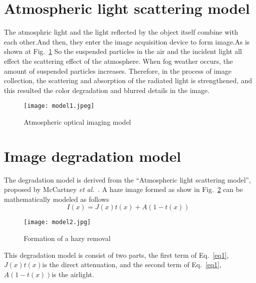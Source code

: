 \documentclass[10pt,twocolumn,letterpaper]{article}
\begin{document}
\section{Atmospheric light scattering model}
 \par The atmosphric light and the light reflected by the object itself combine with each other.And then, they enter the image acquisition device to form image.As is shown at Fig.~\ref{model1} So the suspended particles in the air and the incident light all effect the scattering effect of the atmosphere. When fog weather occurs, the amount of suspended particles increases. Therefore, in the process of image collection, the scattering and absorption of the radiated light is strengthened, and this resulted the color degradation and blurred details in the image.
\begin{figure}[htbp]
 \centering{}
\texttt{[image: model1.jpeg]}\\
 \caption{Atmospheric optical imaging model}
\label{model1}
\end{figure}
\section{Image degradation model}
 \par The degradation model is derived from the “Atmospheric light scattering model”, proposed by McCartney \emph{et al.}~\cite{Mccartney1976Optics}. A haze image formed as show in Fig.~\ref{model2} can be mathematically modeled as follows
\begin{equation}
I(x)=J(x)t(x)+A(1-t(x)) \label{eq1}
\end{equation}
\begin{figure}[htbp]
 \centering{}
\texttt{[image: model2.jpg]}\\
 \caption{Formation of a hazy removal}
\label{model2}
\end{figure}
\par This degradation model is consist of two parts, the first term of Eq.~\ref{eq1}, $J(x)t(x)$is the direct attenuation, and the second term of Eq.~\ref{eq1}, $A(1-t(x))$is the airlight.
 
 
\end{document}
